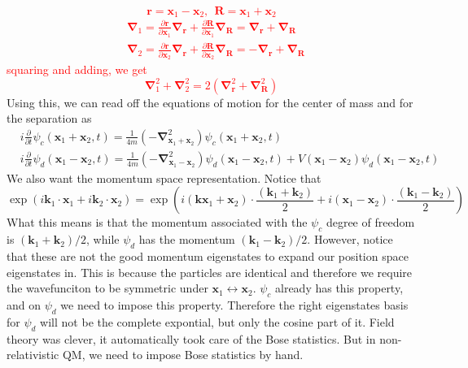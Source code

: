 \documentclass[11pt]{article}
\newcommand{\del}{\partial}
\numberwithin{equation}{section}
\begin{document}
    \textcolor{red}{
        \begin{equation*}
            \textbf{r} = \textbf{x}_1 - \textbf{x}_2,~~\textbf{R} = \textbf{x}_1 + \textbf{x}_2
        \end{equation*}
        \begin{align*}
            &\mathbf\nabla_1 = \frac{\del \textbf{r}}{\del \textbf{x}_1}\mathbf\nabla_\textbf{r} +  \frac{\del \textbf{R}}{\del \textbf{x}_1}\mathbf\nabla_\textbf{R} = \mathbf{\nabla}_\textbf{r} + \mathbf{\nabla}_\textbf{R}\\
            &\mathbf\nabla_2 = \frac{\del \textbf{r}}{\del \textbf{x}_2}\mathbf\nabla_\textbf{r} +  \frac{\del \textbf{R}}{\del \textbf{x}_2}\mathbf\nabla_\textbf{R} = -\mathbf{\nabla}_\textbf{r} + \mathbf{\nabla}_\textbf{R}
        \end{align*}
        squaring and adding, we get 
        \begin{equation*}
            \mathbf\nabla_1^2 + \mathbf\nabla_2^2 = 2(\mathbf{\nabla}_\textbf{r}^2 + \mathbf{\nabla}_\textbf{R}^2)
        \end{equation*}
    }
    Using this, we can read off the equations of motion for the center of mass and for the separation as 
    \begin{align*}
        &i\frac{\del}{\del t}\psi_c(\textbf{x}_1+ \textbf{x}_2,t) = \frac{1}{4m}\left( -\mathbf\nabla_{\textbf{x}_1 + \textbf{x}_2}^2 \right) \psi_c(\textbf{x}_1 + \textbf{x}_2,t)\\
        &i\frac{\del}{\del t}\psi_d(\textbf{x}_1- \textbf{x}_2,t) = \frac{1}{4m}\left( -\mathbf\nabla_{\textbf{x}_1 - \textbf{x}_2}^2 \right) \psi_d(\textbf{x}_1 - \textbf{x}_2,t) + V(\textbf{x}_1 - \textbf{x}_2)\psi_d(\textbf{x}_1 - \textbf{x}_2,t)
    \end{align*}
    We also want the momentum space representation. Notice that 
    \begin{equation*}
        \exp(i\textbf{k}_1 \cdot \textbf{x}_1 + i\textbf{k}_2 \cdot \textbf{x}_2) = \exp\left( i(\textbf{kx}_1 + \textbf{x}_2)\cdot \frac{(\textbf{k}_1 + \textbf{k}_2)}{2} + i(\textbf{x}_1 - \textbf{x}_2)\cdot \frac{(\textbf{k}_1 - \textbf{k}_2)}{2}     \right)
    \end{equation*}
    What this means is that the momentum associated with the \(\psi_c\) degree of freedom is \((\textbf{k}_1 + \textbf{k}_2)/2\), while \(\psi_d\) has the momentum \((\textbf{k}_1 - \textbf{k}_2)/2\). However, notice that these are not the good momentum eigenstates to expand our position space eigenstates in. This is because the particles are identical and therefore we require the wavefunciton to be symmetric under \(\textbf{x}_1 \leftrightarrow \textbf{x}_2\). \(\psi_c\) already has this property, and on \(\psi_d\) we need to impose this property. Therefore the right eigenstates basis for \(\psi_d\) will not be the complete expontial, but only the cosine part of it. Field theory was clever, it automatically took care of the Bose statistics. But in non-relativistic QM, we need to impose Bose statistics by hand. \\
\end{document}
